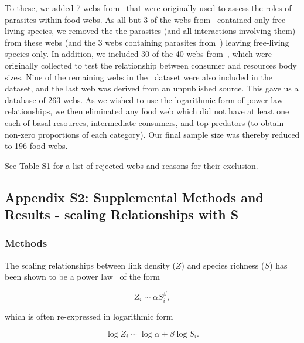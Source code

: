 \documentclass[12pt]{article}
\begin{document}
  To these, we added 7 webs from~\citet{Dunne2013} that were originally used
  to assess the roles of parasites within food webs. As all but 3 of the webs
  from~\citet{GlobalWeb} contained only free-living species, we removed the
  the parasites (and all interactions involving them) from these webs (and the
  3 webs containing parasites from~\citet{GlobalWeb}) leaving free-living
  species only. In addition, we included 30 of the 40 webs
  from~\citet{Riede2011}, which were originally collected to test the
  relationship between consumer and resources body sizes. Nine of the
  remaining webs in the~\citet{Riede2011} dataset were also included in
  the~\citet{GlobalWeb}  dataset, and the last web was derived from an
  unpublished source. This gave us a database of 263 webs. As we wished to use
  the logarithmic form of power-law relationships, we then eliminated any food
  web which did not have at least one each of basal resources, intermediate
  consumers, and top predators (to obtain  non-zero proportions of each
  category). Our final sample size was thereby reduced to 196 food webs.



 See Table S1 for a list of rejected webs and reasons for their
  exclusion. 


\subsection*{Appendix S2: Supplemental Methods and Results - scaling Relationships with S}

  \subsubsection*{Methods}

    The scaling relationships between link density ($Z$) and species richness ($S$)
    has been shown to be a power law~\citep{Riede2010} of the form 

    \begin{equation}
    \label{Power}
    Z_{i} \sim \alpha S_{i}^{\beta}  ,
    \end{equation}

    \noindent which is often re-expressed in logarithmic form 

    \begin{equation}
    \label{Loglog}
    \log{Z_{i}} \sim \log{\alpha} + \beta\log{S_{i}}  .
    \end{equation}
\end{document}
